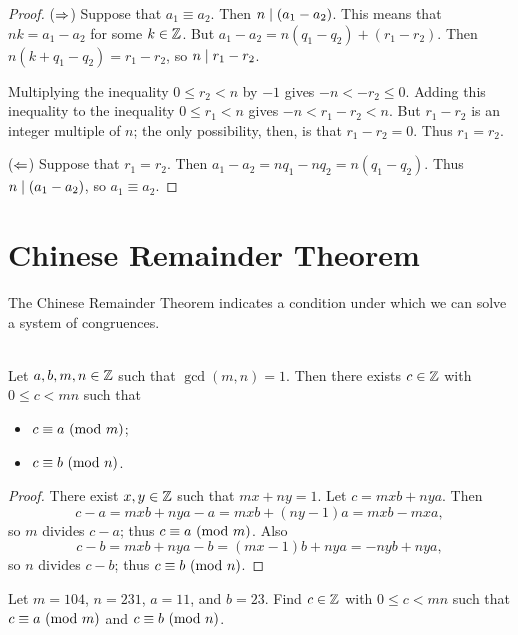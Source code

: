 \documentclass{amsart}
\begin{document}
\begin{proof}
\text{ }

($\Rightarrow$) Suppose that $a_{1} \equiv a_{2}$. Then $n \mid (a_{1}
- a_{2})$. This means that $nk = a_{1} - a_{2}$ for some $k \in
\mathbb{Z}$. But $a_{1} - a_{2} = n(q_{1}-q_{2}) + (r_{1} - r_{2})$. Then
$n(k + q_{1} - q_{2}) = r_{1} - r_{2}$, so $n \mid r_{1} -
r_{2}$.

Multiplying the inequality $0 \le r_{2} < n$ by $-1$
gives $-n < -r_{2} \le 0$.
Adding this inequality to the inequality $0 \le r_{1} < n$
gives $-n < r_{1}-r_{2} < n$.
But $r_{1} - r_{2}$ is an integer multiple of $n$;
the only possibility, then, is that $r_{1} - r_{2} = 0$.
Thus $r_{1} = r_{2}$.

($\Leftarrow$)
Suppose that $r_{1} = r_{2}$.
Then $a_{1} - a_{2} = nq_{1} - nq_{2} = n(q_{1}-q_{2})$.
Thus $n \mid (a_{1} - a_{2})$,
so $a_{1} \equiv a_{2}$.
\end{proof}

\newpage

\section{Chinese Remainder Theorem}

The Chinese Remainder Theorem indicates a condition under which we can solve a system
of congruences.

\begin{Prop}  \\
Let $a,b,m,n \in \mathbb{Z}$ such that $\gcd(m,n) = 1$.
Then there exists $c \in \mathbb{Z}$ with $0 \le c < mn$ such that
\begin{itemize}
\item $c \equiv a \text{\rm{ (mod }}{m}\text{\rm{)}}$;
\item $c \equiv b \text{\rm{ (mod }}{n}\text{\rm{)}}$.
\end{itemize}
\end{Prop}

\begin{proof}
There exist $x,y \in \mathbb{Z}$ such that $mx + ny = 1$.
Let $c = mxb + nya$.
Then
\[ c - a = mxb + nya - a = mxb + (ny-1)a = mxb - mxa, \]
so $m$ divides $c-a$; thus $c \equiv a \text{\rm{ (mod }}{m}\text{\rm{)}}$.
Also
\[ c - b = mxb + nya - b = (mx-1)b + nya = -nyb + nya, \]
so $n$ divides $c-b$; thus $c \equiv b \text{\rm{ (mod }}{n}\text{\rm{)}}$.
\end{proof}

\begin{Exm}
Let $m = 104$, $n = 231$, $a = 11$, and $b = 23$.
Find $c \in \mathbb{Z}$ with $0 \le c < mn$ such that $c \equiv a \text{\rm{ (mod }}{m}\text{\rm{)}}$ and $c \equiv b \text{\rm{ (mod }}{n}\text{\rm{)}}$.
\end{Exm}
\end{document}
